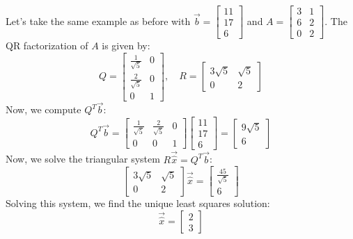 \begin{eg}
    Let's take the same example as before with $\vec{b} = \begin{bmatrix}
        11 \\ 17 \\ 6
    \end{bmatrix}$ and $A = \begin{bmatrix}
        3 & 1 \\ 6 & 2 \\ 0 & 2
    \end{bmatrix}$. The QR factorization of $A$ is given by:
    \[
        Q = \begin{bmatrix}
            \frac{1}{\sqrt{5}} & 0 \\
            \frac{2}{\sqrt{5}} & 0 \\
            0 & 1
        \end{bmatrix}, \quad R = \begin{bmatrix}
            3 \sqrt{5} & \sqrt{5} \\
            0 & 2
        \end{bmatrix}
    \]
    Now, we compute $Q^T \vec{b}$:
    \[
        Q^T \vec{b} = \begin{bmatrix}
            \frac{1}{\sqrt{5}} & \frac{2}{\sqrt{5}} & 0 \\
            0 & 0 & 1
        \end{bmatrix} \begin{bmatrix}
            11 \\ 17 \\ 6
        \end{bmatrix} = \begin{bmatrix}
            9 \sqrt{5} \\ 6
        \end{bmatrix}
    \]
    Now, we solve the triangular system $R \vec{\hat{x}} = Q^T \vec{b}$:
    \[
        \begin{bmatrix}
            3 \sqrt{5} & \sqrt{5} \\
            0 & 2
        \end{bmatrix} \vec{\hat{x}} = \begin{bmatrix}
            \frac{45}{\sqrt{5}} \\ 6
        \end{bmatrix}
    \]
    Solving this system, we find the unique least squares solution:
    \[
        \vec{\hat{x}} = \begin{bmatrix}
            2 \\ 3
        \end{bmatrix}
    \]
\end{eg}

